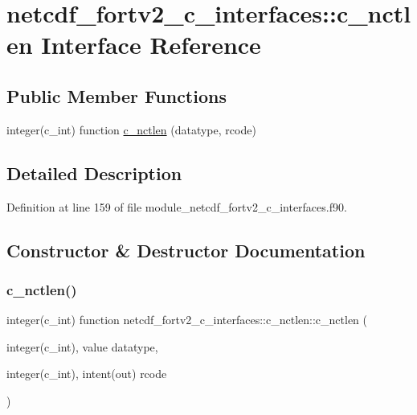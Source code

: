 \hypertarget{interfacenetcdf__fortv2__c__interfaces_1_1c__nctlen}{}\section{netcdf\+\_\+fortv2\+\_\+c\+\_\+interfaces\+:\+:c\+\_\+nctlen Interface Reference}
\label{interfacenetcdf__fortv2__c__interfaces_1_1c__nctlen}
\subsection*{Public Member Functions}
\begin{DoxyCompactItemize}
\item 
integer(c\+\_\+int) function \hyperlink{interfacenetcdf__fortv2__c__interfaces_1_1c__nctlen_a063893e939d2faf9c119595dc27f5363}{c\+\_\+nctlen} (datatype, rcode)
\end{DoxyCompactItemize}


\subsection{Detailed Description}


Definition at line 159 of file module\+\_\+netcdf\+\_\+fortv2\+\_\+c\+\_\+interfaces.\+f90.



\subsection{Constructor \& Destructor Documentation}
\mbox{\label{interfacenetcdf__fortv2__c__interfaces_1_1c__nctlen_a063893e939d2faf9c119595dc27f5363}} 
\subsubsection{\texorpdfstring{c\+\_\+nctlen()}{c\_nctlen()}}
{\footnotesize\ttfamily integer(c\+\_\+int) function netcdf\+\_\+fortv2\+\_\+c\+\_\+interfaces\+::c\+\_\+nctlen\+::c\+\_\+nctlen (\begin{DoxyParamCaption}\item[{integer(c\+\_\+int), value}]{datatype,  }\item[{integer(c\+\_\+int), intent(out)}]{rcode }\end{DoxyParamCaption})}



